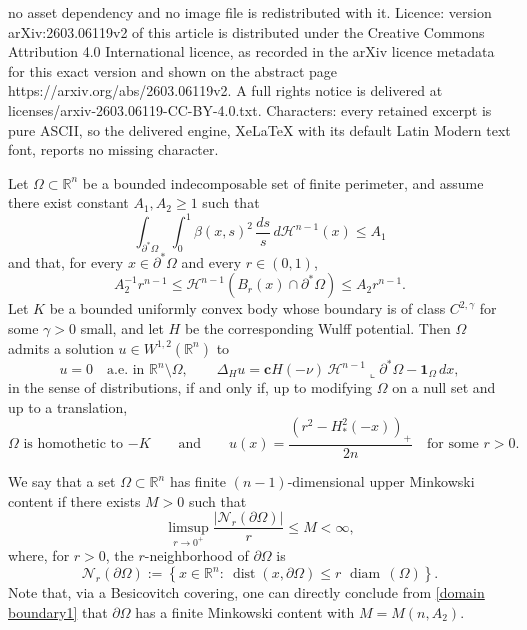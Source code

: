 \documentclass[10pt,a4paper]{amsart}
\def\dfrac{\displaystyle\frac}
\def\diam{{\mathop\mathrm{\,diam\,}}}
\def\dist{{\mathop\mathrm{dist}}}
\begin{document}
no asset dependency and no image file is redistributed with it. Licence: version arXiv:2603.06119v2 of this article is distributed under the Creative Commons Attribution 4.0 International licence, as recorded in the arXiv licence metadata for this exact version and shown on the abstract page https://arxiv.org/abs/2603.06119v2. A full rights notice is delivered at licenses/arxiv-2603.06119-CC-BY-4.0.txt. Characters: every retained excerpt is pure ASCII, so the delivered engine, XeLaTeX with its default Latin Modern text font, reports no missing character.
\begin{thm}\label{main thm}
Let $\Omega\subset \mathbb R^n$ be a bounded indecomposable set of finite perimeter,  and assume there exist constant $A_1,A_2\geq 1$ such that 
\begin{equation}\label{beta number}
\int_{\partial^* \Omega}\int_{0}^{1} \beta(x,s)^2 \, \frac{ds} {s} \, d\mathscr H^{n-1}(x)\le A_1
\end{equation}
and that, for every $x\in \partial^* \Omega$ and every $r \in (0,1)$,
\begin{equation}\label{domain boundary1}
A_2^{-1}r^{n-1}\le \mathscr H^{n-1}(B_r(x)\cap \partial^* \Omega)\le A_2 r^{n-1}.
\end{equation}
Let $K$ be a bounded uniformly convex body whose boundary is of class
$C^{2,\gamma}$ for some $\gamma>0$ small, and let $H$ be the corresponding Wulff potential.
Then $\Omega$ admits a solution $u\in W^{1,2}(\mathbb R^n)$ to
\begin{equation}\label{eq:weak set finite per}
u=0\quad \text{a.e.\ in }\mathbb R^n\setminus \Omega,\qquad
\Delta_H u=\mathbf{c}H(-\nu)\,\mathscr{H}^{n-1}\llcorner \partial^*\Omega - \mathbf{1}_{\Omega}\,dx,
\end{equation}
in the sense of distributions, if and only if, {up to modifying $\Omega$ on a null set and up to a translation,} 
\[
{
\text{$\Omega$ is homothetic to $-K$}\qquad \text{and}\qquad
u(x)=\dfrac{(r^2-H_*^2(-x))_+}{2n}\quad \text{for some }r>0.
}
\]
\end{thm}

\begin{rem}
We say that a set $\Omega\subset\mathbb R^n$ has finite $(n-1)$-dimensional upper Minkowski content if there exists $M>0$ such that
\begin{equation}\label{eq:minkowski-content}
    {\limsup_{r\to 0^+} \frac{|\mathcal N_{r}(\partial\Omega)|}{r}\le M<\infty,}
\end{equation}
where, for $r>0$, the $r$-neighborhood of $\partial\Omega$ is
\[
\mathcal N_r(\partial\Omega):=\left\{ x\in \mathbb R^n:\ \dist(x,\partial \Omega)\le r\,\diam(\Omega) \right\}.
\]
Note that, via a Besicovitch covering, one can directly conclude from \eqref{domain boundary1} that $\partial \Omega$ has a finite
Minkowski content with $M=M(n,A_2)$.
\end{rem}
\end{document}
